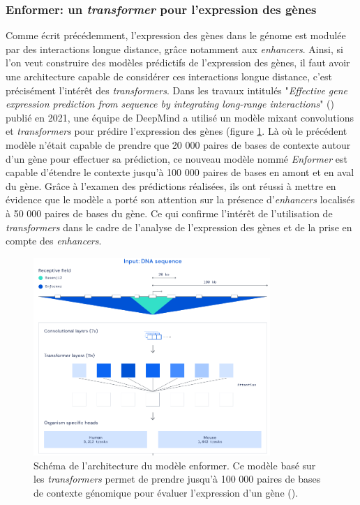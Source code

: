 \subsubsection{Enformer: un \textit{transformer} pour l'expression des gènes}
Comme écrit précédemment, l'expression des gènes dans le génome est modulée par des interactions longue distance, grâce notamment aux \textit{enhancers}. Ainsi, si l’on veut construire des modèles prédictifs de l'expression des gènes, il faut avoir une architecture capable de considérer ces interactions longue distance, c'est précisément l'intérêt des \textit{transformers}. Dans les travaux intitulés "\textit{Effective gene expression prediction from sequence by integrating long-range interactions}" (\cite{avsec_effective_2021}) publié en 2021, une équipe de DeepMind a utilisé un modèle mixant convolutions et \textit{transformers} pour prédire l'expression des gènes (figure \ref{fig:enformer}. Là où le précédent modèle n'était capable de prendre que 20 000 paires de bases de contexte autour d'un gène pour effectuer sa prédiction, ce nouveau modèle nommé \textit{Enformer} est capable d'étendre le contexte jusqu'à 100 000 paires de bases en amont et en aval du gène. Grâce à l'examen des prédictions réalisées, ils ont réussi à mettre en évidence que le modèle a porté son attention sur la présence d'\textit{enhancers} localisés à 50 000 paires de bases du gène. Ce qui confirme l'intérêt de l'utilisation de \textit{transformers} dans le cadre de l'analyse de l'expression des gènes et de la prise en compte des \textit{enhancers}.
\begin{figure}[!ht]
 \centering
 \includegraphics[width=0.8\textwidth]{figures/enformer.png}
 \caption[Schéma de l'architecture du modèle enformer]{Schéma de l'architecture du modèle enformer. Ce modèle basé sur les \textit{transformers} permet de prendre jusqu'à 100 000 paires de bases de contexte génomique pour évaluer l'expression d'un gène (\cite{avsec_effective_2021}).}
 \label{fig:enformer}
\end{figure}
